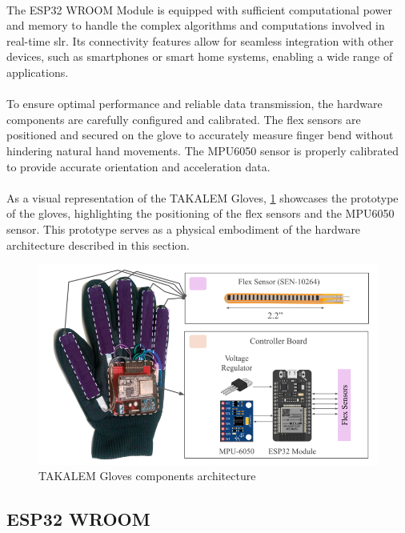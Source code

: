 \paragraph{}
The ESP32 WROOM Module is equipped with sufficient computational power and memory to handle the complex algorithms and computations involved in real-time \ac{slr}. Its connectivity features allow for seamless integration with other devices, such as smartphones or smart home systems, enabling a wide range of applications.
\paragraph{}
To ensure optimal performance and reliable data transmission, the hardware components are carefully configured and calibrated. The flex sensors are positioned and secured on the glove to accurately measure finger bend without hindering natural hand movements. The MPU6050 sensor is properly calibrated to provide accurate orientation and acceleration data.
\paragraph{}
As a visual representation of the TAKALEM Gloves, \ref{fig:prototype} showcases the prototype of the gloves, highlighting the positioning of the flex sensors and the MPU6050 sensor. This prototype serves as a physical embodiment of the hardware architecture described in this section.
\begin{figure}[h]
	\centering
	\includegraphics[width=0.7\linewidth]{images/prototype}
	\caption{TAKALEM Gloves components architecture}
	\label{fig:prototype}
\end{figure}
\subsection{ESP32 WROOM}
